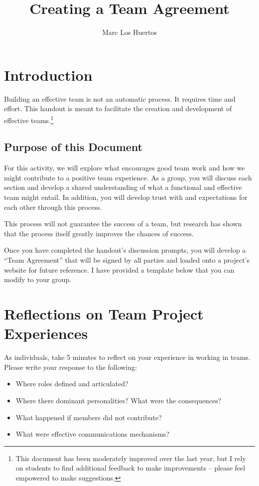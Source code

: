 \documentclass{article}\usepackage[]{graphicx}\usepackage[]{color}
\title{Creating a Team Agreement}
\author{Marc Los Huertos}
\begin{document}
\maketitle

\section{Introduction}

Building an effective team is not an automatic process. It requires time and effort. This handout is meant to facilitate the creation and development of effective teams.\footnote{This document has been moderately improved over the last year, but I rely on students to find additional feedback to make improvements -- please feel empowered to make suggestions.}

\subsection{Purpose of this Document}

For this activity, we will explore what encourages good team work and how we might contribute to a positive team experience. As a group, you will discuss each section and develop a shared understanding of what a functional and effective team might entail. In addition, you will develop trust with and expectations for each other through this process. 

This process will not guarantee the success of a team, but research has shown that the process itself greatly improves the chances of success.

Once you have completed the handout's discussion prompts, you will develop a ``Team Agreement'' that will be signed by all parties and loaded onto a project's website for future reference. I have provided a template below that you can modify to your group. 

\section{Reflections on Team Project Experiences}

As individuals, take 5 minutes to reflect on your experience in working in teams. Please write your response to the following:

\begin{itemize}

\item Where roles defined and articulated?
\item Where there dominant personalities? What were the consequences?
\item What happened if members did not contribute?
\item What were effective communications mechanisms?

\end{itemize}
\end{document}
